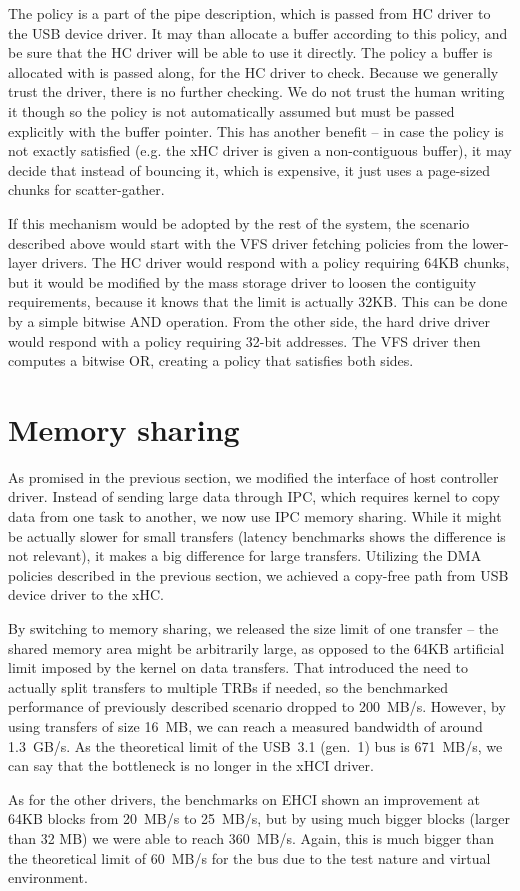 The policy is a part of the pipe description, which is passed from HC driver to
the USB device driver. It may than allocate a buffer according to this
policy, and be sure that the HC driver will be able to use it directly. The
policy a buffer is allocated with is passed along, for the HC driver to check.
Because we generally trust the driver, there is no further checking. We do not
trust the human writing it though so the policy is not automatically assumed
but must be passed explicitly with the buffer pointer. This has another benefit
-- in case the policy is not exactly satisfied (e.g. the xHC driver is given
a non-contiguous buffer), it may decide that instead of bouncing it, which is
expensive, it just uses a page-sized chunks for scatter-gather.

If this mechanism would be adopted by the rest of the system, the scenario
described above would start with the VFS driver fetching policies from the
lower-layer drivers. The HC driver would respond with a policy requiring 64KB
chunks, but it would be modified by the mass storage driver to loosen the
contiguity requirements, because it knows that the limit is actually 32KB. This
can be done by a simple bitwise AND operation. From the other side, the hard
drive driver would respond with a policy requiring 32-bit addresses. The VFS
driver then computes a bitwise OR, creating a policy that satisfies both sides.

\section{Memory sharing}

As promised in the previous section, we modified the interface of host
controller driver. Instead of sending large data through IPC, which requires
kernel to copy data from one task to another, we now use IPC memory sharing.
While it might be actually slower for small transfers (latency benchmarks shows
the difference is not relevant), it makes a big difference for large transfers.
Utilizing the DMA policies described in the previous section, we achieved
a copy-free path from USB device driver to the xHC.

By switching to memory sharing, we released the size limit of one transfer --
the shared memory area might be arbitrarily large, as opposed to the 64KB
artificial limit imposed by the kernel on data transfers. That introduced the
need to actually split transfers to multiple TRBs if needed, so the benchmarked
performance of previously described scenario dropped to 200~MB/s. However, by
using transfers of size 16~MB, we can reach a measured bandwidth of around 1.3~GB/s.
As the theoretical limit of the USB~3.1 (gen.~1) bus is 671~MB/s, we can say that the
bottleneck is no longer in the xHCI driver.

As for the other drivers, the benchmarks on EHCI shown an improvement at 64KB
blocks from 20~MB/s to 25~MB/s, but by using much bigger blocks (larger than 32
MB) we were able to reach 360~MB/s. Again, this is much bigger than the
theoretical limit of 60~MB/s for the bus due to the test nature and virtual
environment.
